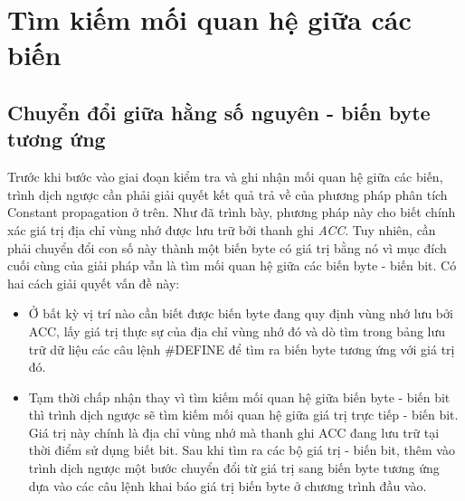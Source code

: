 \section{Tìm kiếm mối quan hệ giữa các biến}
\subsection{Chuyển đổi giữa hằng số nguyên - biến byte tương ứng}
\label{sec:transfer}
Trước khi bước vào giai đoạn kiểm tra và ghi nhận mối quan hệ giữa các biến, trình dịch ngược cần phải giải quyết kết quả trả về của phương pháp phân tích Constant propagation ở trên. Như đã trình bày, phương pháp này cho biết chính xác giá trị địa chỉ vùng nhớ được lưu trữ bởi thanh ghi \textit{ACC}. Tuy nhiên, cần phải chuyển đổi con số này thành một biến byte có giá trị bằng nó vì mục đích cuối cùng của giải pháp vẫn là tìm mối quan hệ giữa các biến byte - biến bit. Có hai cách giải quyết vấn đề này:
\begin{itemize}
	\item Ở bất kỳ vị trí nào cần biết được biến byte đang quy định vùng nhớ lưu bởi ACC, lấy giá trị thực sự của địa chỉ vùng nhớ đó và dò tìm trong bảng lưu trữ dữ liệu các câu lệnh \#DEFINE để tìm ra biến byte tương ứng với giá trị đó.
	\item Tạm thời chấp nhận thay vì tìm kiếm mối quan hệ giữa biến byte - biến bit thì trình dịch ngược sẽ tìm kiếm mối quan hệ giữa giá trị trực tiếp - biến bit. Giá trị này chính là địa chỉ vùng nhớ mà thanh ghi ACC đang lưu trữ tại thời điểm sử dụng biết bit. Sau khi tìm ra các bộ giá trị - biến bit, thêm vào trình dịch ngược một bước chuyển đổi từ giá trị sang biến byte tương ứng dựa vào các câu lệnh khai báo giá trị biến byte ở chương trình đầu vào.
\end{itemize}

